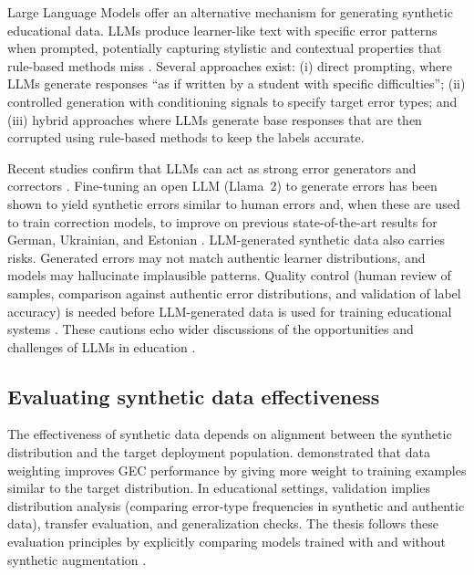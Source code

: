 Large Language Models offer an alternative mechanism for generating synthetic educational data. LLMs produce learner-like text with specific error patterns when prompted, potentially capturing stylistic and contextual properties that rule-based methods miss \parencite{Brown2020,Ouyang2022}. Several approaches exist: (i) direct prompting, where LLMs generate responses ``as if written by a student with specific difficulties''; (ii) controlled generation with conditioning signals to specify target error types; and (iii) hybrid approaches where LLMs generate base responses that are then corrupted using rule-based methods to keep the labels accurate.

Recent studies confirm that LLMs can act as strong error generators and correctors \parencite{CoyneSakaguchi2023,Bryant2023GECsurvey}. Fine-tuning an open LLM (Llama~2) to generate errors has been shown to yield synthetic errors similar to human errors and, when these are used to train correction models, to improve on previous state-of-the-art results for German, Ukrainian, and Estonian \parencite{Luhtaru2024}. LLM-generated synthetic data also carries risks. Generated errors may not match authentic learner distributions, and models may hallucinate implausible patterns. Quality control (human review of samples, comparison against authentic error distributions, and validation of label accuracy) is needed before LLM-generated data is used for training educational systems \parencite{Bryant2023GECsurvey}. These cautions echo wider discussions of the opportunities and challenges of LLMs in education \parencite{Kasneci2023}.

\subsection{Evaluating synthetic data effectiveness}
\label{sec:sota_synth_eval}

The effectiveness of synthetic data depends on alignment between the synthetic distribution and the target deployment population. \textcite{Lichtarge2020} demonstrated that data weighting improves GEC performance by giving more weight to training examples similar to the target distribution. In educational settings, validation implies distribution analysis (comparing error-type frequencies in synthetic and authentic data), transfer evaluation, and generalization checks. The thesis follows these evaluation principles by explicitly comparing models trained with and without synthetic augmentation \parencite{Lichtarge2020,Bryant2023GECsurvey}.

